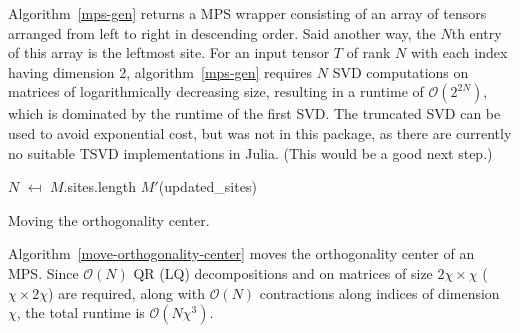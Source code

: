 \documentclass[12pt]{article}
\begin{document}
\begin{multicols}{2}
		Algorithm~\ref{mps-gen} returns a MPS wrapper consisting of an array of
		tensors arranged from left to right in descending order. Said another way,
		the $N$th entry of this array is the leftmost site. For an input tensor $T$ of rank $N$ with each index having dimension 2, algorithm~\ref{mps-gen} requires $N$ SVD computations on matrices of logarithmically decreasing size, resulting in a runtime of $\mathcal{O}(2^{2N})$, which is dominated by the runtime of the first SVD. The truncated SVD can be used to avoid exponential cost, but was not in this package, as there are currently no suitable TSVD implementations in Julia. (This would be a good next step.)

	\begin{algorithm}[H]
		$N$ $\mapsfrom$ $M$.sites.length\;
		\Return $M'$(updated\_sites)\;
		\caption{Moving the orthogonality center.}
		\label{move-orthogonality-center}
	\end{algorithm}
	Algorithm~\ref{move-orthogonality-center} moves the orthogonality center of an MPS. Since $\mathcal{O}(N)$ QR (LQ) decompositions and on matrices of size $2\chi\times\chi$ ($\chi\times2\chi$) are required, along with $\mathcal{O}(N)$ contractions along indices of dimension $\chi$, the total runtime is $\mathcal{O}(N\chi^3)$.


\end{multicols}
\end{document}
